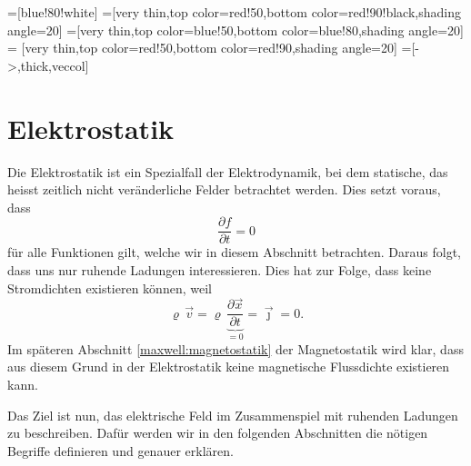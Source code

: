 %
%
%
%

\tikzset{>=latex} %
\usetikzlibrary {arrows.meta}
\pgfplotsset{compat=1.13}
\usetikzlibrary{decorations.markings,intersections,calc}
\usetikzlibrary{angles,quotes} %
=[blue!80!white]
=[very thin,top color=red!50,bottom color=red!90!black,shading angle=20]
=[very thin,top color=blue!50,bottom color=blue!80,shading angle=20]
 = [very thin,top color=red!50,bottom color=red!90,shading angle=20]
=[->,thick,veccol]


\section{Elektrostatik\label{maxwell:section:elekktrostatik}}
Die Elektrostatik ist ein Spezialfall der Elektrodynamik, bei dem statische, das heisst zeitlich nicht veränderliche Felder betrachtet werden.
Dies setzt voraus, dass
\begin{equation}
	\frac{\partial f}{\partial t}
	=
	0
	\label{maxwell:section:definition_statik}
\end{equation}
für alle Funktionen gilt, welche wir in diesem Abschnitt betrachten.
Daraus folgt, dass uns nur ruhende Ladungen interessieren.
Dies hat zur Folge, dass keine Stromdichten existieren können, weil
\begin{equation}
	\varrho\,\vec{v}
	=
	\varrho\, \underbrace{\frac{\partial \vec{x}}{\partial t}}_{=0}
	=
	\vec{\jmath}
	=
	0.
\end{equation}
Im späteren Abschnitt \ref{maxwell:magnetostatik} der Magnetostatik wird klar, dass aus diesem Grund in der Elektrostatik keine magnetische Flussdichte existieren kann.
 
Das Ziel ist nun, das elektrische Feld im Zusammenspiel mit ruhenden Ladungen zu beschreiben.
Dafür werden wir in den folgenden Abschnitten die nötigen Begriffe definieren und genauer erklären.

